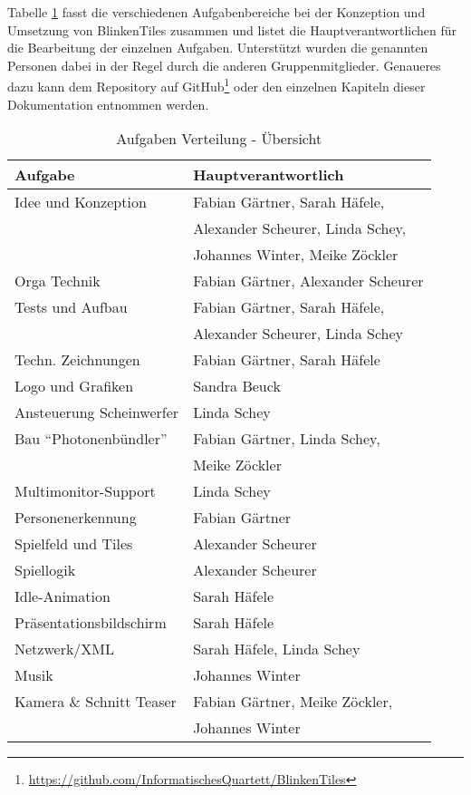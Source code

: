 
Tabelle \ref{tab:aufgaben} fasst die verschiedenen Aufgabenbereiche bei der Konzeption und Umsetzung von BlinkenTiles zusammen und listet die Hauptverantwortlichen für die Bearbeitung der einzelnen Aufgaben. Unterstützt wurden die genannten Personen dabei in der Regel durch die anderen Gruppenmitglieder. Genaueres dazu kann dem Repository auf GitHub\footnote{\url{https://github.com/InformatischesQuartett/BlinkenTiles}} oder den einzelnen Kapiteln dieser Dokumentation entnommen werden.

\vspace{0.8em}

\begin{table}[hc]
\begin{center}
\begin{tabular}[hc]{l|l}
\textbf{Aufgabe} & \textbf{Hauptverantwortlich}\\
\hline
Idee und Konzeption& Fabian Gärtner, Sarah Häfele,\\
&Alexander Scheurer, Linda Schey,\\
&Johannes Winter, Meike Zöckler\\\hline
Orga Technik& Fabian Gärtner, Alexander Scheurer\\\hline
Tests und Aufbau& Fabian Gärtner, Sarah Häfele,\\
&Alexander Scheurer, Linda Schey\\\hline
Techn. Zeichnungen& Fabian Gärtner, Sarah Häfele\\\hline
Logo und Grafiken& Sandra Beuck\\\hline
Ansteuerung Scheinwerfer&Linda Schey\\\hline
Bau \enquote{Photonenbündler}&Fabian Gärtner, Linda Schey,\\&Meike Zöckler\\\hline
Multimonitor-Support& Linda Schey\\\hline
Personenerkennung& Fabian Gärtner\\\hline
Spielfeld und Tiles& Alexander Scheurer\\\hline
Spiellogik& Alexander Scheurer\\\hline
Idle-Animation& Sarah Häfele\\\hline
Präsentationsbildschirm& Sarah Häfele\\\hline
Netzwerk/XML& Sarah Häfele, Linda Schey\\\hline
Musik& Johannes Winter\\\hline
Kamera \& Schnitt Teaser&Fabian Gärtner, Meike Zöckler,\\&Johannes Winter\\
\hline
\end{tabular}
\caption{Aufgaben Verteilung - Übersicht}
\label{tab:aufgaben}
\end{center}
\end{table}
